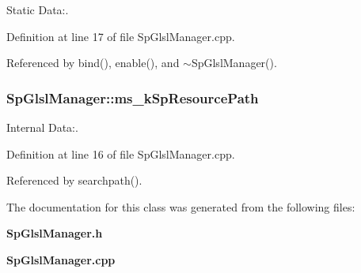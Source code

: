 Static Data:. 

Definition at line 17 of file Sp\-Glsl\-Manager.cpp.

Referenced by bind(), enable(), and $\sim$Sp\-Glsl\-Manager().
\subsubsection{ {\bf Sp\-Glsl\-Manager::ms\_\-k\-Sp\-Resource\-Path}\hspace{0.3cm}{\tt  [static, protected]}}\label{classSpark_1_1SpGlslManager_t0}


Internal Data:. 

Definition at line 16 of file Sp\-Glsl\-Manager.cpp.

Referenced by searchpath().

The documentation for this class was generated from the following files:\begin{CompactItemize}
\item 
{\bf Sp\-Glsl\-Manager.h}\item 
{\bf Sp\-Glsl\-Manager.cpp}\end{CompactItemize}
